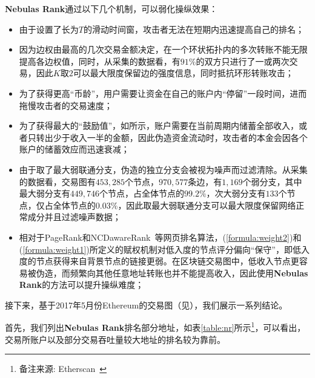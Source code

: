 \textbf{Nebulas Rank}通过以下几个机制，可以弱化操纵效果：
\begin{itemize}
	\item 由于设置了长为$T$的滑动时间窗，攻击者无法在短期内迅速提高自己的排名；
	\item 因为边权由最高的几次交易金额决定，在一个环状拓扑内的多次转账不能无限提高各边权值，同时，从采集的数据看，有$91\%$的双方只进行了一或两次交易，因此$K$取$2$可以最大限度保留边的强度信息，同时抵抗环形转账攻击；
	\item 为了获得更高“币龄”，用户需要让资金在自己的账户内“停留”一段时间，进而拖慢攻击者的交易速度；
	\item 为了获得最大的“鼓励值”，如所示，账户需要在当前周期内储蓄全部收入，或者只转出少于收入一半的金额，因此伪造资金流动时，攻击者的本金会因各个账户的储蓄效应而迅速衰减；
	\item 由于取了最大弱联通分支，伪造的独立分支会被视为噪声而过滤清除。从采集的数据看，交易图有$453,285$个节点，$970,577$条边，有$1,169$个弱分支，其中最大弱分支有$449,746$个节点，占全体节点的$99.2\%$，次大弱分支有$133$个节点，仅占全体节点的$0.03\%$，因此取最大弱联通分支可以最大限度保留网络正常成分并且过滤噪声数据；
	\item 相对于PageRank和NCDawareRank~\cite{Nikolakopoulos2013}等网页排名算法，(\ref{formula:weight2})和(\ref{formula:weight1})所定义的赋权机制对低入度的节点评分偏向“保守”，即低入度的节点获得来自背景节点的链接更弱。在区块链交易图中，低收入节点更容易被伪造，而频繁向其他任意地址转账也并不能提高收入，因此使用\textbf{Nebulas Rank}的方法可以提升操纵难度；
\end{itemize}

接下来，基于2017年5月份Ethereum的交易图（见），我们展示一系列结论。

首先，我们列出\textbf{Nebulas Rank}排名部分地址，如表\ref{table:nr}所示\footnote{备注来源: Etherscan~\cite{etherscan}}，可以看出，交易所账户以及部分交易吞吐量较大地址的排名较为靠前。

\newpage

